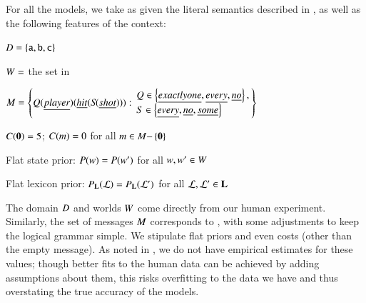 \documentclass[leqno,12pt]{article}
\begin{document}
For all the models, we take as given the literal semantics described
in , as well as the following features of the
context:
%
\begin{examples}
\item\label{expmod}
  \begin{examples}
  \item $D = \left\{ \texttt{a}, \texttt{b}, \texttt{c} \right\}$
  \item $W = $ the set in 
  \item\label{expformulae} $\Messages =
    \setlength{\arraycolsep}{2pt}
    \set{
      Q(\word{player})(\word{hit}(S\negthinspace(\word{shot}))) :
      \begin{array}{l}        
        Q \in \set{\word{exactly one}, \word{every}, \word{no}}, \\
        S \in \set{\word{every}, \word{no}, \word{some}}
      \end{array}}$
  \item $C(\mathbf{0}) = 5$; $C(m) = 0$ for all $m \in M{-}\left\{ \mathbf{0} \right\}$  
  \item Flat state prior: $P(w) = P(w')$ for all $w, w' \in W$
  \item Flat lexicon prior: $P_{\mathbf{L}}(\mathcal{L}) = P_{\mathbf{L}}(\mathcal{L}')$ for all $\mathcal{L}, \mathcal{L}' \in \mathbf{L}$
  \end{examples}
\end{examples}

The domain $D$ and worlds $W$ come directly from our human
experiment. Similarly, the set of messages $M$ corresponds to
, with some adjustments to keep the logical grammar
simple. We stipulate flat priors and even costs (other than the empty message). As noted in
, we do not have empirical estimates for these
values; though better fits to the human data can be achieved by adding
assumptions about them, this risks overfitting to the data we have and
thus overstating the true accuracy of the models.
\end{document}
